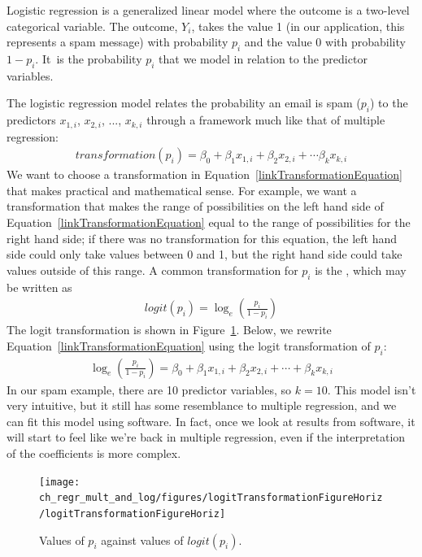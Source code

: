 Logistic regression is a generalized linear model where the outcome is a two-level categorical variable. The outcome, $Y_i$, takes the value 1 (in our application, this represents a spam message) with probability $p_i$ and the value 0 with probability $1-p_i$. It~is the probability $p_i$ that we model in relation to the predictor variables.

The logistic regression model relates the probability an email is spam ($p_i$) to the predictors $x_{1,i}$, $x_{2,i}$, ..., $x_{k,i}$ through a framework much like that of multiple regression:
\begin{align}
transformation(p_{i}) = \beta_0 + \beta_1x_{1,i} + \beta_2 x_{2,i} + \cdots \beta_k x_{k,i}
\label{linkTransformationEquation}
\end{align}
We want to choose a transformation in Equation~\eqref{linkTransformationEquation} that makes practical and mathematical sense. For example, we want a transformation that makes the range of possibilities on the left hand side of Equation~\eqref{linkTransformationEquation} equal to the range of possibilities for the right hand side; if there was no transformation for this equation, the left hand side could only take values between 0 and 1, but the right hand side could take values outside of this range. A common transformation for $p_i$ is the , which may be written as
\begin{align*}
logit(p_i) = \log_{e}\left( \frac{p_i}{1-p_i} \right)
\end{align*}
The logit transformation is shown in Figure~\ref{logitTransformationFigureHoriz}. Below, we rewrite Equation~\eqref{linkTransformationEquation} using the logit transformation of $p_i$:
\begin{align*}
\log_{e}\left( \frac{p_i}{1-p_i} \right)
	= \beta_0 + \beta_1 x_{1,i} + \beta_2 x_{2,i} + \cdots + \beta_k x_{k,i}
\end{align*}
In our spam example, there are 10 predictor variables, so $k = 10$. This model isn't very intuitive, but it still has some resemblance to multiple regression, and we can fit this model using software. In fact, once we look at results from software, it will start to feel like we're back in multiple regression, even if the interpretation of the coefficients is more complex.

\begin{figure}
\centering
\texttt{[image: ch\_regr\_mult\_and\_log/figures/logitTransformationFigureHoriz/logitTransformationFigureHoriz]}
\caption{Values of $p_i$ against values of $logit(p_i)$.}
\label{logitTransformationFigureHoriz}
\end{figure}

